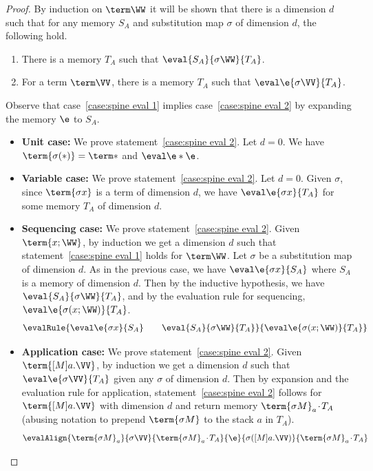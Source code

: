 \documentclass[a4paper,UKenglish,cleveref, autoref, thm-restate]{lipics-v2021}
\newcommand\case[1]{\textbf{#1}}
\newcommand\msep{\kern1pt{\cdot}\kern1pt}
\begin{document}
\spineNFterminate*

\begin{proof}
By induction on $\term\WW$ it will be shown that there is a dimension $d$ such that for any memory $S_A$ and substitution map $\sigma$ of dimension $d$, the following hold.
\begin{enumerate}

\item\label{case:spine eval 1} 
There is a memory $T_A$ such that $\eval{S_A}{\sigma\WW}{T_A}$.

\item\label{case:spine eval 2}
For a term $\term\VV$, there is a memory $T_A$ such that $\eval\e{\sigma\VV}{T_A}$.

\end{enumerate}
Observe that case~\ref{case:spine eval 1} implies case~\ref{case:spine eval 2} by expanding the memory $\e$ to $S_A$.

\begin{itemize}

\item\case{Unit case:}
We prove statement~\ref{case:spine eval 2}. Let $d=0$. We have $\term{\sigma(*)}=\term*$ and $\eval\e*\e$.

\item\case{Variable case:}
We prove statement~\ref{case:spine eval 2}. Let $d=0$. Given $\sigma$, since $\term{\sigma x}$ is a term of dimension $d$, we have $\eval\e{\sigma x}{T_A}$ for some memory $T_A$ of dimension $d$.

\item\case{Sequencing case:}
We prove statement~\ref{case:spine eval 2}. Given $\term{x;\WW}$, by induction we get a dimension $d$ such that statement~\ref{case:spine eval 1} holds for $\term\WW$. Let $\sigma$ be a substitution map of dimension $d$. As in the previous case, we have $\eval\e{\sigma x}{S_A}$ where $S_A$ is a memory of dimension $d$. Then by the inductive hypothesis, we have $\eval {S_A}{\sigma\WW}{T_A}$, and by the evaluation rule for sequencing, $\eval\e{\sigma(x;\WW)}{T_A}$.
\[
\evalRule
    {\eval\e{\sigma x}{S_A} \qquad \eval{S_A}{\sigma\WW}{T_A}}
	{\eval\e{\sigma(x;\WW)}{T_A}} 
\]

\item\case{Application case:}
We prove statement~\ref{case:spine eval 2}. Given $\term{[M]a.\VV}$, by induction we get a dimension $d$ such that $\eval\e{\sigma\VV}{T_A}$ given any $\sigma$ of dimension $d$. Then by expansion and the evaluation rule for application, statement~\ref{case:spine eval 2} follows for $\term{[M]a.\VV}$ with dimension $d$ and return memory $\term{\sigma M}_a\msep T_A$ (abusing notation to prepend $\term{\sigma M}$ to the stack $a$ in $T_A$).
\[
	\evalAlign
	  {\term{\sigma M}_a}       {\sigma\VV}  {\term{\sigma M}_a\msep T_A}
	  {\e}                {\sigma([M]a.\VV)} {\term{\sigma M}_a\msep T_A} 
\]


\end{itemize}
\end{proof}
\end{document}
